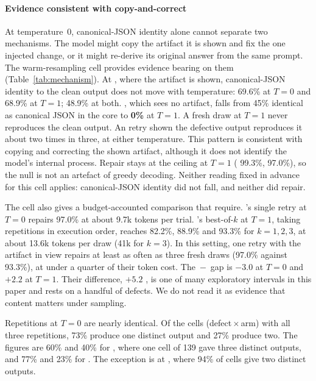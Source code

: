 \paragraph{Evidence consistent with copy-and-correct}
At temperature~0, canonical-JSON identity alone cannot separate two mechanisms. The model
might copy the artifact it is shown and fix the one injected change, or it
might re-derive its original answer from the same prompt. The warm-resampling
cell provides evidence bearing on them (Table~\ref{tab:mechanism}). At , where the
artifact is shown, canonical-JSON identity to the clean output does not move with
temperature:  69.6\% at $T=0$ and 68.9\% at $T=1$;  48.9\% at
both. , which sees no artifact, falls from 45\% identical as canonical JSON in the
core to \textbf{0\%} at $T=1$. A fresh draw at $T=1$ never reproduces the clean
output. An  retry shown the defective output reproduces it about two
times in three, at either temperature. This pattern is consistent with copying and correcting the shown artifact, although it does not identify the model's internal process. Repair stays at the ceiling at $T=1$
( 99.3\%,  97.0\%), so the null is not an artefact of greedy
decoding. Neither reading fixed in advance for this cell applies: canonical-JSON identity
did not fall, and neither did repair.

The cell also gives a budget-accounted comparison that
\citet{olausson2024selfrepair} require. 's single retry at $T=0$ repairs
97.0\% at about 9.7k tokens per trial. 's best-of-$k$ at $T=1$, taking
repetitions in execution order, reaches 82.2\%, 88.9\% and 93.3\% for $k=1,2,3$,
at about 13.6k tokens per draw (41k for $k=3$). In this setting, one retry with
the artifact in view repairs at least as often as three fresh draws (97.0\%
against 93.3\%), at under a quarter of their token cost. The
\,$-$\, gap is $-3.0$\pp{}  at $T=0$ and
$+2.2$\pp{}  at $T=1$. Their difference, $+5.2$\pp{}
, is one of many exploratory intervals in this paper and rests
on a handful of defects. We do not read it as evidence that content matters
under sampling.

Repetitions at $T=0$ are nearly identical. Of the  cells
(defect\,$\times$\,arm) with all three repetitions, 73\% produce one distinct
output and 27\% produce two. The figures are 60\% and 40\% for , where
one cell of 139 gave three distinct outputs, and 77\% and 23\% for .
The exception is  at , where 94\% of cells give two distinct
outputs.

